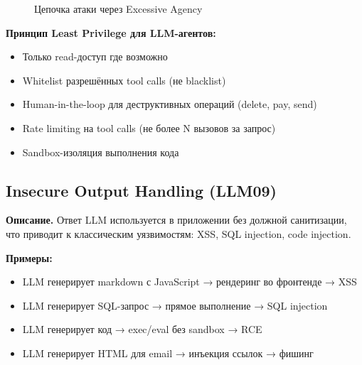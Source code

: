 \documentclass[12pt,a4paper]{article}
\begin{document}
\begin{figure}[H]
\centering
{}
\caption{Цепочка атаки через Excessive Agency}
\label{fig:excessive_agency}
\end{figure}

\textbf{Принцип Least Privilege для LLM-агентов:}
\begin{itemize}
  \item Только read-доступ где возможно
  \item Whitelist разрешённых tool calls (не blacklist)
  \item Human-in-the-loop для деструктивных операций (delete, pay, send)
  \item Rate limiting на tool calls (не более N вызовов за запрос)
  \item Sandbox-изоляция выполнения кода
\end{itemize}

\subsection{Insecure Output Handling (LLM09)}

\textbf{Описание.} Ответ LLM используется в приложении без должной санитизации, что приводит к классическим уязвимостям: XSS, SQL injection, code injection.

\textbf{Примеры:}
\begin{itemize}
  \item LLM генерирует markdown с JavaScript → рендеринг во фронтенде → XSS
  \item LLM генерирует SQL-запрос → прямое выполнение → SQL injection
  \item LLM генерирует код → exec/eval без sandbox → RCE
  \item LLM генерирует HTML для email → инъекция ссылок → фишинг
\end{itemize}
\end{document}
